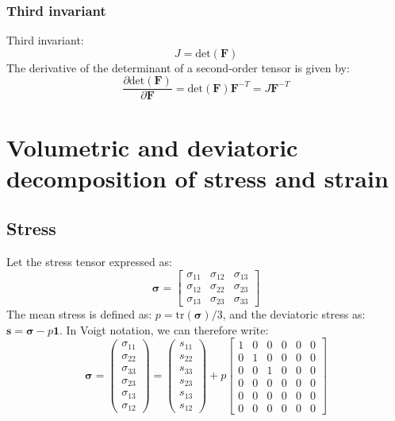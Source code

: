 \documentclass[letterpaper,12pt,oneside]{report}
\begin{document}
\subsubsection{Third invariant}

Third invariant:
\begin{equation}
J = \mathrm{det}(\bm{F})
\end{equation}
The derivative of the determinant of a second-order tensor is given by:
\begin{equation}
\frac{\partial \mathrm{det}(\bm{F})}{\partial \bm{F}} = \mathrm{det}(\bm{F}) \bm{F}^{-T} = J \bm{F}^{-T}
\end{equation}


\section{Volumetric and deviatoric decomposition of stress and strain}

\subsection{Stress}
Let the stress tensor expressed as:
\begin{equation}
\boldsymbol{\sigma} = 
\left[\begin{array}{ccc}
\sigma_{11} & \sigma_{12} & \sigma_{13} \\
\sigma_{12} & \sigma_{22} & \sigma_{23} \\
\sigma_{13} & \sigma_{23} & \sigma_{33}
\end{array}\right]
\end{equation}
The mean stress is defined as: $p = \mathrm{tr}(\boldsymbol{\sigma})/3$, and the deviatoric stress as: $\mathbf{s} = \boldsymbol{\sigma} - p \mathbf{1}$. In Voigt notation, we can therefore write:
\begin{equation}
\boldsymbol{\sigma} = 
\left(\begin{array}{c}
\sigma_{11} \\ \sigma_{22} \\ \sigma_{33} \\ \sigma_{23} \\ \sigma_{13} \\ \sigma_{12}
\end{array}\right)
 = 
\left(\begin{array}{c}
s_{11} \\ s_{22} \\ s_{33} \\ s_{23} \\ s_{13} \\ s_{12}
\end{array}\right)
+ p
\left[\begin{array}{cccccc}
1 & 0 & 0 & 0 & 0 & 0 \\
0 & 1 & 0 & 0 & 0 & 0 \\
0 & 0 & 1 & 0 & 0 & 0 \\
0 & 0 & 0 & 0 & 0 & 0 \\
0 & 0 & 0 & 0 & 0 & 0 \\
0 & 0 & 0 & 0 & 0 & 0
\end{array}\right]
\end{equation}
\end{document}
